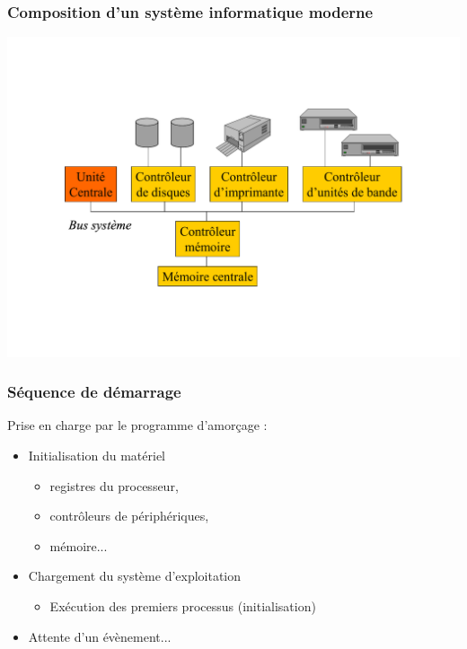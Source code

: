 \begin{frame}
 \frametitle{Composition d’un système informatique moderne}
 \includegraphics[width=\textwidth]{../illustration/archi_si.pdf}
\end{frame}


\begin{frame}
\frametitle{Séquence de démarrage}
Prise en charge par le programme d’amorçage :
\begin{itemize}
\item Initialisation du matériel
\begin{itemize}
\item registres du processeur,
\item contrôleurs de périphériques,
\item mémoire...
\end{itemize}
\item Chargement du système d’exploitation
\begin{itemize}
\item Exécution des premiers processus (initialisation)
\end{itemize}
\item Attente d’un évènement...
\end{itemize}
\end{frame}



